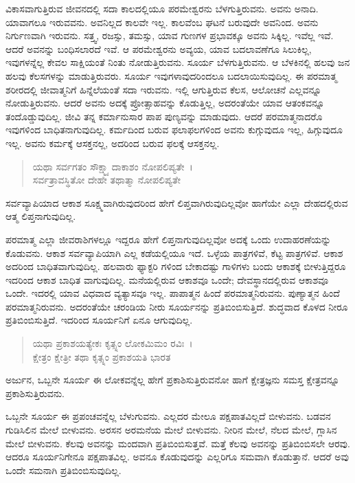 ವಿಕಾಸವಾಗುತ್ತಿರುವ ಜೀವನದಲ್ಲಿ ಸದಾ ಕಾಲದಲ್ಲಿಯೂ ಪರಮೇಶ್ವರನು ಬೆಳಗುತ್ತಿರುವನು. ಅವನು ಅನಾದಿ. ಯಾವಾಗಲೂ ಇರುವವನು. ಅವನಿಲ್ಲದ ಕಾಲವೇ ಇಲ್ಲ. ಕಾಲವೆಂಬ ಘಟನೆ ಬರುವುದೇ ಅವನಿಂದ. ಅವನು ನಿರ್ಗುಣವಾಗಿ ಇರುವನು. ಸತ್ತ್ವ, ರಜಸ್ಸು, ತಮಸ್ಸು, ಯಾವ ಗುಣಗಳ ಪ್ರಭಾವಕ್ಕೂ ಅವನು ಸಿಕ್ಕಿಲ್ಲ. ಇವೆಲ್ಲ ಇವೆ. ಆದರೆ ಅವನನ್ನು ಬಂಧಿಸಲಾರದೆ ಇವೆ. ಆ ಪರಮೇಶ್ವರನು ಅವ್ಯಯ, ಯಾವ ಬದಲಾವಣೆಗೂ ಸಿಲುಕಿಲ್ಲ, ಇವುಗಳನ್ನೆಲ್ಲ ಕೇವಲ ಸಾಕ್ಷಿಯಂತೆ ನಿಂತು ನೋಡುತ್ತಿರುವನು. ಸೂರ್ಯ ಬೆಳಗುತ್ತಿರುವನು. ಆ ಬೆಳಕಿನಲ್ಲಿ ಹಲವು ಜನ ಹಲವು ಕೆಲಸಗಳನ್ನು ಮಾಡುತ್ತಿರುವರು. ಸೂರ್ಯ ಇವುಗಳಾವುದರಿಂದಲೂ ಬದಲಾಯಿಸುವುದಿಲ್ಲ. ಈ ಪರಮಾತ್ಮ ಶರೀರದಲ್ಲಿ ಜೀವಾತ್ಮನಿಗೆ ಹಿನ್ನೆಲೆಯಂತೆ ಸದಾ ಇರುವನು. ಇಲ್ಲಿ ಆಗುತ್ತಿರುವ ಕೆಲಸ, ಆಲೋಚನೆ ಎಲ್ಲವನ್ನೂ ನೋಡುತ್ತಿರುವನು. ಆದರೆ ಅವನು ಅದಕ್ಕೆ ಪ್ರೋತ್ಸಾಹವನ್ನು ಕೊಡುತ್ತಿಲ್ಲ, ಅದರಂತೆಯೇ ಯಾವ ಆತಂಕವನ್ನೂ ತಂದೊಡ್ಡುವುದಿಲ್ಲ. ಜೀವಿ ತನ್ನ ಕರ್ಮಾನುಸಾರ ಪಾಪ ಪುಣ್ಯವನ್ನು ಮಾಡುವುದು. ಆದರೆ ಪರಮಾತ್ಮನಾದರೊ ಇವುಗಳಿಂದ ಬಾಧಿತನಾಗುವುದಿಲ್ಲ. ಕರ್ಮದಿಂದ ಬರುವ ಫಲಾಫಲಗಳಿಂದ ಅವನು ಕುಗ್ಗುವುದೂ ಇಲ್ಲ, ಹಿಗ್ಗುವುದೂ ಇಲ್ಲ. ಅವನು ಕರ್ಮಕ್ಕೆ ಆಸಕ್ತನಲ್ಲ, ಅದರಿಂದ ಬರುವ ಫಲಕ್ಕೆ ಆಸಕ್ತನಲ್ಲ.

\begin{verse}
ಯಥಾ ಸರ್ವಗತಂ ಸೌಕ್ಷ್ಮ್ಯಾದಾಕಾಶಂ ನೋಪಲಿಪ್ಯತೇ~।\\ಸರ್ವತ್ರಾವಸ್ಥಿತೋ ದೇಹೇ ತಥಾತ್ಮಾ ನೋಪಲಿಪ್ಯತೇ 
\end{verse}

{\small ಸರ್ವವ್ಯಾಪಿಯಾದ ಆಕಾಶ ಸೂಕ್ಷ್ಮವಾಗಿರುವುದರಿಂದ ಹೇಗೆ ಲಿಪ್ತವಾಗಿರುವುದಿಲ್ಲವೋ ಹಾಗೆಯೇ ಎಲ್ಲಾ ದೇಹದಲ್ಲಿರುವ ಆತ್ಮ ಲಿಪ್ತನಾಗುವುದಿಲ್ಲ.}

ಪರಮಾತ್ಮ ಎಲ್ಲಾ ಜೀವರಾಶಿಗಳಲ್ಲೂ ಇದ್ದರೂ ಹೇಗೆ ಲಿಪ್ತನಾಗುವುದಿಲ್ಲವೋ ಅದಕ್ಕೆ ಒಂದು ಉದಾಹರಣೆಯನ್ನು ಕೊಡುವನು. ಆಕಾಶ ಸರ್ವವ್ಯಾಪಿಯಾಗಿ ಎಲ್ಲ ಕಡೆಯಲ್ಲಿಯೂ ಇದೆ. ಒಳ್ಳೆಯ ಪಾತ್ರಗಳಿವೆ, ಕೆಟ್ಟ ಪಾತ್ರಗಳಿವೆ. ಆಕಾಶ ಅದರಿಂದ ಬಾಧಿತವಾಗುವುದಿಲ್ಲ. ಹಲವಾರು ಫ್ಯಾಕ್ಟರಿ ಗಳಿಂದ ಬೇಕಾದಷ್ಟು ಗಾಳಿಗಳು ಬಂದು ಆಕಾಶಕ್ಕೆ ಬೀಳುತ್ತಿದ್ದರೂ ಇದರಿಂದ ಆಕಾಶ ಬಾಧಿತ ವಾಗುವುದಿಲ್ಲ. ಮನೆಯಲ್ಲಿರುವ ಆಕಾಶವೂ ಒಂದೇ; ದೇವಸ್ಥಾನದಲ್ಲಿರುವ ಆಕಾಶವೂ ಒಂದೇ. ಇದರಲ್ಲಿ ಯಾವ ವಿಧವಾದ ವ್ಯತ್ಯಾಸವೂ ಇಲ್ಲ. ಪಾಪಾತ್ಮನ ಹಿಂದೆ ಪರಮಾತ್ಮನಿರುವನು. ಪುಣ್ಯಾತ್ಮನ ಹಿಂದೆ ಪರಮಾತ್ಮನಿರುವನು. ಅದರಂತೆಯೇ ಚರಂಡಿಯ ನೀರು ಸೂರ್ಯನನ್ನು ಪ್ರತಿಬಿಂಬಿಸುತ್ತಿದೆ. ಶುದ್ಧವಾದ ಕೊಳದ ನೀರೂ ಪ್ರತಿಬಿಂಬಿಸುತ್ತಿದೆ. ಇದರಿಂದ ಸೂರ್ಯನಿಗೆ ಏನೂ ಆಗುವುದಿಲ್ಲ.

\begin{verse}
ಯಥಾ ಪ್ರಕಾಶಯತ್ಯೇಕಃ ಕೃತ್ಸ್ನಂ ಲೋಕಮಿಮಂ ರವಿಃ~।\\ಕ್ಷೇತ್ರಂ ಕ್ಷೇತ್ರೀ ತಥಾ ಕೃತ್ಸ್ನಂ ಪ್ರಕಾಶಯತಿ ಭಾರತ 
\end{verse}

{\small ಅರ್ಜುನ, ಒಬ್ಬನೇ ಸೂರ್ಯ ಈ ಲೋಕವನ್ನೆಲ್ಲ ಹೇಗೆ ಪ್ರಕಾಶಿಸುತ್ತಿರುವನೋ ಹಾಗೆ ಕ್ಷೇತ್ರಜ್ಞನು ಸಮಸ್ತ ಕ್ಷೇತ್ರವನ್ನೂ ಪ್ರಕಾಶಿಸುತ್ತಿರುವನು.}

ಒಬ್ಬನೇ ಸೂರ್ಯ ಈ ಪ್ರಪಂಚವನ್ನೆಲ್ಲ ಬೆಳುಗುವನು. ಎಲ್ಲದರ ಮೇಲೂ ಪಕ್ಷಪಾತವಿಲ್ಲದೆ ಬೀಳುವನು. ಬಡವನ ಗುಡಿಸಿಲಿನ ಮೇಲೆ ಬೀಳುವನು. ಅರಸನ ಅರಮನೆಯ ಮೇಲೆ ಬೀಳುವನು. ನೀರಿನ ಮೇಲೆ, ನೆಲದ ಮೇಲೆ, ಗ್ಲಾಸಿನ ಮೇಲೆ ಬೀಳುವನು. ಕೆಲವು ಅವನನ್ನು ಮಂದವಾಗಿ ಪ್ರತಿಬಿಂಬಿಸುತ್ತವೆ. ಮತ್ತೆ ಕೆಲವು ಅವನನ್ನು ಪ್ರತಿಬಿಂಬಿಸಲೇ ಆರವು. ಆದರೂ ಸೂರ್ಯನಿಗೇನೂ ಪಕ್ಷಪಾತವಿಲ್ಲ. ಅವನೂ ಕೊಡುವುದನ್ನು ಎಲ್ಲರಿಗೂ ಸಮವಾಗಿ ಕೊಡುತ್ತಾನೆ. ಆದರೆ ಅವು ಒಂದೇ ಸಮನಾಗಿ ಪ್ರತಿಬಿಂಬಿಸುವುದಿಲ್ಲ.

